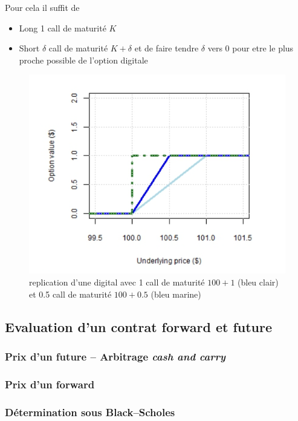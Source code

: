 \documentclass[a4paper]{article}
\begin{document}
Pour cela il suffit de 
\begin{itemize}
    \item Long 1 call de maturité $K$
    \item Short $\delta$ call de maturité $K+\delta$ et de faire tendre $\delta$ vers 0 pour etre le plus proche possible de l'option digitale
\end{itemize}
\begin{figure}[H]
    \centering
    \includegraphics{figures/replicating.png}
    \caption{replication d'une digital avec 1 call de maturité $100+1$ (bleu clair) et 0.5 call de maturité $100+0.5$ (bleu marine)}
    \label{fig:enter-label}
\end{figure}

\subsection{Evaluation d'un contrat forward et future}

\subsubsection{Prix d'un future -- Arbitrage \textit{cash and carry}}



\subsubsection{Prix d'un forward}
\subsubsection{Détermination sous Black--Scholes}
\end{document}
